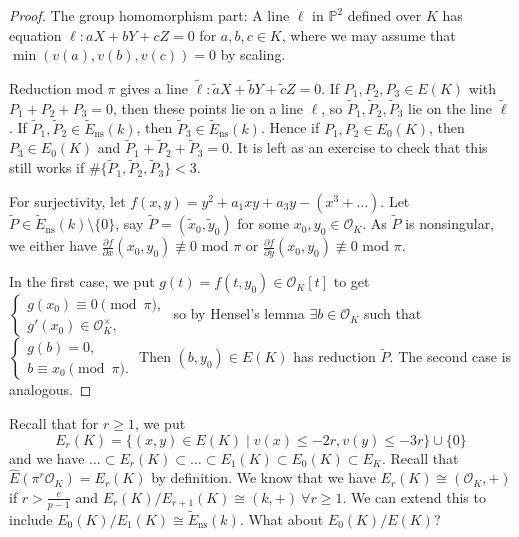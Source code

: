 \documentclass{article}
\theoremstyle{definition}
\begin{document}
\begin{proof}
    The group homomorphism part: A line $\ell$ in $\mathbb{P}^2$ defined over $K$ has equation $\ell : aX+bY+cZ=0$ for $a,b,c \in K$, where we may assume that $\min(v(a),v(b),v(c))=0$ by scaling.
    \vspace{1mm}
     
    Reduction mod $\pi$ gives a line $\widetilde{\ell}: \widetilde{a}X+\widetilde{b}Y+\widetilde{c}Z=0$. If $P_1,P_2,P_3 \in E(K)$ with $P_1+P_2+P_3=0$, then these points lie on a line $\ell$, so $\widetilde{P}_1, \widetilde{P}_2, \widetilde{P}_3$ lie on the line $\widetilde{\ell}$. If $\widetilde{P}_1,\widetilde{P}_2 \in \widetilde{E}_{\text{ns}}(k)$, then $\widetilde{P}_3 \in \widetilde{E}_{\text{ns}}(k)$. Hence if $P_1,P_2 \in E_0(K)$, then $P_3 \in E_0(K)$ and $\widetilde{P}_1 + \widetilde{P}_2 + \widetilde{P}_3=0$. It is left as an exercise to check that this still works if $\#\{\widetilde{P}_1,\widetilde{P}_2,\widetilde{P}_3\}<3$.
    \vspace{1mm}
     
    For surjectivity, let $f(x,y) = y^2+a_1xy+a_3y-(x^3+\ldots)$. Let $\widetilde{P} \in \widetilde{E}_{\text{ns}}(k) \setminus \{0\}$, say $\widetilde{P}=(\widetilde{x}_0,\widetilde{y}_0)$ for some $x_0,y_0 \in \mathcal{O}_K$. As $\widetilde{P}$ is nonsingular, we either have $\frac{\partial f}{\partial x}(x_0,y_0) \not\equiv 0$ mod $\pi$ or $\frac{\partial f}{\partial y}(x_0,y_0) \not\equiv 0$ mod $\pi$.
    \vspace{1mm}
     
    In the first case, we put $g(t)=f(t,y_0) \in \mathcal{O}_K[t]$ to get $\begin{cases}
        g(x_0)\equiv 0\pmod{\pi},\\
        g'(x_0) \in \mathcal{O}_K^\times,
    \end{cases}$ so by Hensel's lemma $\exists b \in \mathcal{O}_K$ such that $\begin{cases}
        g(b)=0,\\
        b \equiv x_0 \pmod{\pi}. 
    \end{cases}$ Then $(b,y_0) \in E(K)$ has reduction $\widetilde{P}$. The second case is analogous.
\end{proof}
Recall that for $r\ge 1$, we put \[
E_r(K)= \{(x,y) \in E(K) \mid v(x)\le -2r,v(y)\le -3r\} \cup \{0\}
\]
and we have $\ldots \subset E_r(K) \subset \ldots \subset E_1(K) \subset E_0(K)\subset E_K$. Recall that $\widehat{E}(\pi^r \mathcal{O}_K) = E_r(K)$ by definition. We know that we have $E_r(K) \cong (\mathcal{O}_K,+)$ if $r>\frac{e}{p-1}$ and $E_r(K)/E_{r+1}(K) \cong (k,+) ~\forall r\ge 1$. We can extend this to include $E_0(K)/E_1(K) \cong \widetilde{E}_{\text{ns}}(k)$. What about $E_0(K)/E(K)$?
\end{document}
